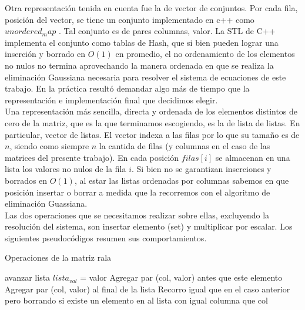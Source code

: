 Otra representación tenida en cuenta fue la de vector de conjuntos. Por cada fila, posición del vector, se tiene un conjunto implementado en c++ como $unordered_map$ \cite{STL}. Tal conjunto es de pares columnas, valor. La STL de C++ implementa el conjunto como tablas de Hash, que si bien pueden lograr una inserción y borrado en $O(1)$ en promedio, el no ordenamiento de los elementos no nulos no termina aprovechando la manera ordenada en que se realiza la eliminación Gaussiana necesaria para resolver el sistema de ecuaciones de este trabajo. En la práctica resultó demandar algo más de tiempo que la representación e implementación final que decidimos elegir. \\

Una representación más sencilla, directa y ordenada de los elementos distintos de cero de la matriz, que es la que terminamos escogiendo, es la de lista de listas. En particular, vector de listas. El vector indexa a las filas por lo que su tamaño es de $n$, siendo como siempre $n$ la cantida de filas (y columnas en el caso de las matrices del presente trabajo). En cada posición $filas[i]$ se almacenan en una lista \cite{STL} los valores no nulos de la fila $i$. Si bien no se garantizan inserciones y borrados en $O(1)$, al estar las listas ordenadas por columnas sabemos en que posición insertar o borrar a medida que la recorremos con el algoritmo de eliminación Guassiana. \\

Las dos operaciones que se necesitamos realizar sobre ellas, excluyendo la resolución del sistema, son insertar elemento (set) y multiplicar por escalar. Los siguientes pseudocódigos resumen sus comportamientos. \\

\begin{algorithm}[H]
\caption{Operaciones de la matriz rala}
\begin{algorithmic}[1]

      \State avanzar lista
    \EndWhile
      \State $lista_{val}$ = valor 
    \Else
         \State Agregar par (col, valor) antes que este elemento 
      \Else
        \State Agregar par (col, valor) al final de la lista 
      \EndIf
    \EndIf              
\Else
    \State Recorro igual que en el caso anterior pero borrando si existe un elemento en al lista con igual columna que 
     col 
        
\EndIf

\EndProcedure  
\end{algorithmic}

\begin{algorithmic}[2]


\EndFor

\EndProcedure  
\end{algorithmic}
\end{algorithm}

